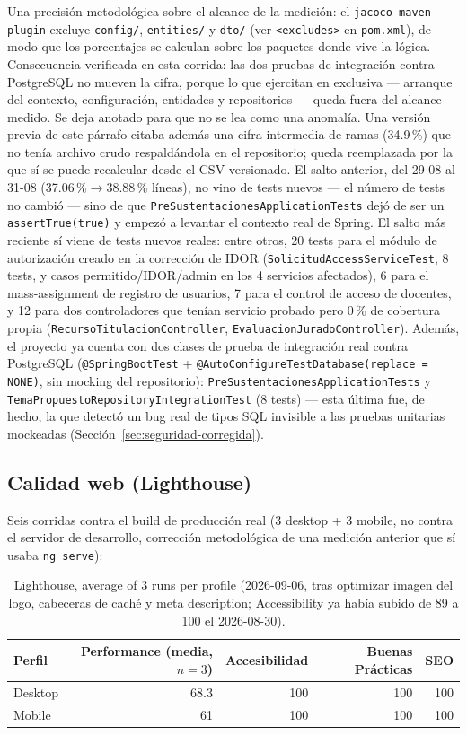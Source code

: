 Una precisión metodológica sobre el alcance de la medición: el \texttt{jacoco-maven-plugin} excluye
\texttt{config/}, \texttt{entities/} y \texttt{dto/} (ver \texttt{<excludes>} en \texttt{pom.xml}), de
modo que los porcentajes se calculan sobre los paquetes donde vive la lógica. Consecuencia verificada en
esta corrida: las dos pruebas de integración contra PostgreSQL no mueven la cifra, porque lo que
ejercitan en exclusiva --- arranque del contexto, configuración, entidades y repositorios --- queda fuera
del alcance medido. Se deja anotado para que no se lea como una anomalía.
Una versión previa de este párrafo citaba además una cifra intermedia de ramas (34.9\,\%) que no tenía
archivo crudo respaldándola en el repositorio; queda reemplazada por la que sí se puede recalcular desde
el CSV versionado.
El salto anterior, del 29-08 al 31-08 (37.06\,\%$\to$38.88\,\% líneas), no vino de tests nuevos --- el
número de tests no cambió --- sino de que \texttt{PreSustentacionesApplicationTests} dejó de ser un
\texttt{assertTrue(true)} y empezó a levantar el contexto real de Spring. El salto más reciente sí viene
de tests nuevos reales: entre otros, 20 tests para el módulo de autorización creado en la corrección de
IDOR (\texttt{SolicitudAccessServiceTest}, 8 tests, y casos permitido/IDOR/admin en los 4 servicios
afectados), 6 para el mass-assignment de registro de usuarios, 7 para el control de acceso de docentes, y
12 para dos controladores que tenían servicio probado pero 0\,\% de cobertura propia
(\texttt{RecursoTitulacionController}, \texttt{EvaluacionJuradoController}). Además, el proyecto ya
cuenta con dos clases de prueba de integración real contra PostgreSQL (\texttt{@SpringBootTest} +
\texttt{@AutoConfigureTestDatabase(replace = NONE)}, sin mocking del repositorio):
\texttt{PreSustentacionesApplicationTests} y \texttt{TemaPropuestoRepositoryIntegrationTest} (8 tests) ---
esta última fue, de hecho, la que detectó un bug real de tipos SQL invisible a las pruebas unitarias
mockeadas (Sección~\ref{sec:seguridad-corregida}).

\subsection{Calidad web (Lighthouse)}

Seis corridas contra el build de producción real (3 desktop + 3 mobile, no contra el servidor de
desarrollo, corrección metodológica de una medición anterior que sí usaba \texttt{ng serve}):

\begin{table}[H]
\centering
\begin{tabular}{lrrrr}
\toprule
\textbf{Perfil} & \textbf{Performance (media, $n=3$)} & \textbf{Accesibilidad} & \textbf{Buenas Prácticas} & \textbf{SEO} \\
\midrule
Desktop & 68.3 & 100 & 100 & 100 \\
Mobile & 61 & 100 & 100 & 100 \\
\bottomrule
\end{tabular}
\caption{Lighthouse, average of 3 runs per profile (2026-09-06, tras optimizar imagen del logo, cabeceras de caché y meta description; Accessibility ya había subido de 89 a 100 el 2026-08-30).}
\end{table}

